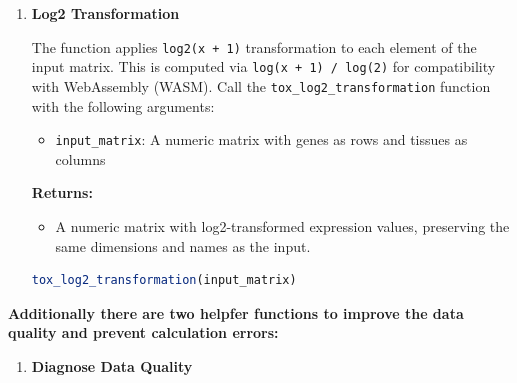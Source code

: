\documentclass[11pt]{article}
\begin{document}
\begin{enumerate}
\begin{enumerate}
	      	      \begin{itemize}
	      	      	\item \texttt{df}: A data frame or matrix with genes as rows and tissue
	      	      	      replicates as columns
	      	      \end{itemize}
	      	      
	      	      \textbf{Returns:}
	      	      \begin{itemize}
	      	      	\item A data frame with genes as rows and averaged tissues as columns
	      	      \end{itemize}
	      	      \begin{lstlisting}[language=R, caption={R Tissue Averages Calculation}]
tox_calculate_tissue_averages(df)
	      	      \end{lstlisting}
	      	      
	      	\item \textbf{Log2 Transformation}
	      	      
	      	      The function applies \texttt{log2(x + 1)} transformation to each
	      	      element of the input matrix. This is computed via \texttt{log(x + 1) /
	      	      	log(2)} for compatibility with WebAssembly (WASM). Call the \texttt{tox\_log2\_transformation}
	      	      function with the following arguments:
	      	      
	      	      \begin{itemize}
	      	      	\item \texttt{input\_matrix}: A numeric matrix with genes as rows and
	      	      	      tissues as columns
	      	      \end{itemize}
	      	      
	      	      \textbf{Returns:}
	      	      \begin{itemize}
	      	      	\item A numeric matrix with log2-transformed expression values,
	      	      	      preserving the same dimensions and names as the input.
	      	      \end{itemize}
	      	      \begin{lstlisting}[language=R, caption={R Log2 Transformation}]
tox_log2_transformation(input_matrix)
	      	      \end{lstlisting}
	      \end{enumerate}
	      
	      \textbf{Additionally there are two helpfer functions to improve the data
	      quality and prevent calculation errors:}
	      \begin{enumerate}
	      	\item \textbf{Diagnose Data Quality}
	      	      

\end{enumerate}
\end{enumerate}
\end{document}
